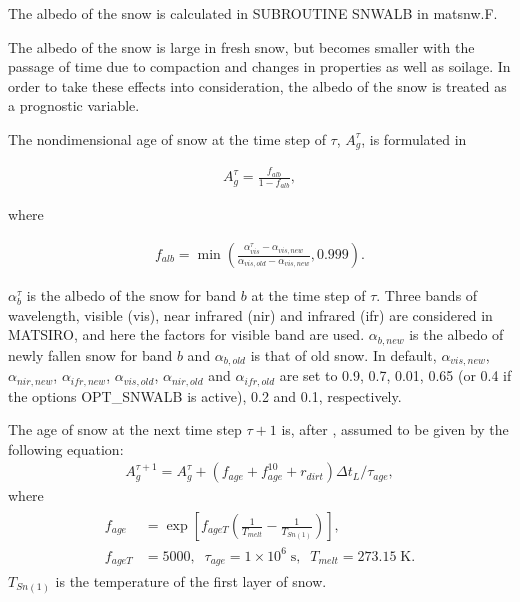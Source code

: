 The albedo of the snow is calculated in SUBROUTINE SNWALB in matsnw.F.

The albedo of the snow is large in fresh snow, but becomes smaller with the passage of time due to compaction and changes in properties as well as soilage. In order to take these effects into
consideration, the albedo of the snow is treated as a prognostic variable.

The nondimensional age of snow at the time step of \({\tau}\), \(A_g^{\tau}\), is formulated in

\begin{eqnarray}
A_g^{\tau} = \frac{f_{alb}}{1-f_{alb}}, \label{8-58}
\end{eqnarray}

where

\begin{eqnarray}
f_{alb} = \min\left(
 \frac{\alpha_{vis}^{\tau}-\alpha_{vis,new}}{\alpha_{vis,old}-\alpha_{vis,new}}, 0.999
\right). \label{8-59}
\end{eqnarray}

\(\alpha_b^{\tau}\) is the albedo of the snow for band \(b\) at the time step of \(\tau\). Three bands of wavelength, visible (vis), near infrared (nir) and infrared (ifr) are considered in MATSIRO,
and here the factors for visible band are used. \(\alpha_{b,new}\) is the albedo of newly fallen snow for band \(b\) and \(\alpha_{b,old}\) is that of old snow. In default, \(\alpha_{vis,new}\),
\(\alpha_{nir,new}\), \(\alpha_{ifr,new}\), \(\alpha_{vis,old}\), \(\alpha_{nir,old}\) and \(\alpha_{ifr,old}\) are set to 0.9, 0.7, 0.01, 0.65 (or 0.4 if the options OPT\_SNWALB is active), 0.2 and
0.1, respectively.

The age of snow at the next time step \({\tau+1}\) is, after \citet{Yang1997-va}, assumed to be given by the following equation: \begin{eqnarray}
A_g^{\tau+1} = A_g^{\tau} + (f_{age} + f_{age}^{10} + r_{dirt})\Delta t_L / \tau_{age}, \label{8-60}
\end{eqnarray} where \begin{eqnarray}
\begin{aligned}
f_{age} &= \exp{\left[ f_{ageT} \left( \frac{1}{T_{melt}} - \frac{1}{T_{Sn(1)}} \right) \right]}, \\
f_{ageT} &= 5000, \;\; \tau_{age} = 1 \times 10^6 \;\mathrm{s}, \;\; T_{melt} = 273.15 \;\mathrm{K}.
\end{aligned} \label{8-61}
\end{eqnarray} \(T_{Sn(1)}\) is the temperature of the first layer of snow.

